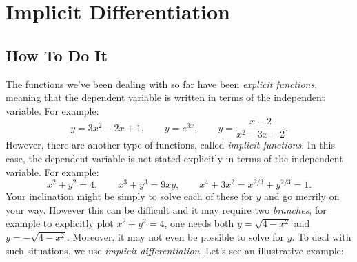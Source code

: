 \chapter{Implicit Differentiation}

\section{How To Do It}

The functions we've been dealing with so far have been
\textit{explicit functions}, meaning that the
dependent variable is written in terms of the independent variable. \cite{mooc} For
example:
$$
y=3x^2-2x+1,\qquad y=e^{3x}, \qquad y = \frac{x-2}{x^2-3x+2}.
$$
However, there are another type of functions, called \textit{implicit
  functions}. In this case, the dependent variable is not stated
explicitly in terms of the independent variable. \cite{mooc} For example:
$$
x^2+y^2 = 4,\qquad x^3+y^3 = 9xy, \qquad x^4+3x^2 = x^{2/3}+y^{2/3} = 1.
$$
Your inclination might be simply to solve each of these for $y$ and go
merrily on your way. However this can be difficult and it may require
two \textit{branches}, for example to explicitly plot $x^2+y^2 = 4$,
one needs both $y= \sqrt{4-x^2}$ and $y=-\sqrt{4-x^2}$. Moreover, it
may not even be possible to solve for $y$. To deal with such
situations, we use \textit{implicit
  differentiation}. \cite{mooc} Let's see an illustrative example:

